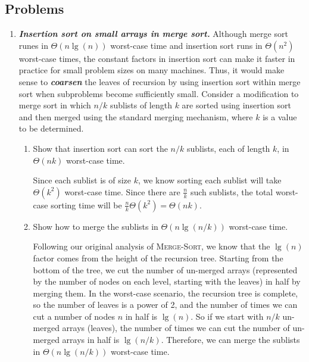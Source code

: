 \documentclass[Chapter02]{subfiles}
\begin{document}
	\subsection*{Problems}

	\begin{enumerate}[leftmargin=\labelsep,label={\textbf{\thesection-\arabic*}}]
		\item \textbf{\textit{Insertion sort on small arrays in merge sort.}} Although merge sort runes in $\Theta(n \lg(n))$ worst-case time and insertion sort runs in $\Theta(n^2)$ worst-case times, the constant factors in insertion sort can make it faster in practice for small problem sizes on many machines. Thus, it would make sense to \textbf{\textit{coarsen}} the leaves of recursion by using insertion sort within merge sort when subproblems become sufficiently small. Consider a modification to merge sort in which $n / k$ sublists of length $k$ are sorted using insertion sort and then merged using the standard merging mechanism, where $k$ is a value to be determined.
		\begin{enumerate}
			\item Show that insertion sort can sort the $n / k$ sublists, each of length $k$, in $\Theta(nk)$ worst-case time.
			\begin{answer}
				Since each sublist is of size $k$, we know sorting each sublist will take $\Theta(k^2)$ worst-case time. Since there are $\frac{n}{k}$ such sublists, the total worst-case sorting time will be $\frac{n}{k} \Theta(k^2) = \Theta(nk)$.
			\end{answer}

			\item Show how to merge the sublists in $\Theta(n \lg(n / k))$ worst-case time.
			\begin{answer}
				Following our original analysis of \textsc{Merge-Sort}, we know that the $\lg(n)$ factor comes from the height of the recursion tree. Starting from the bottom of the tree, we cut the number of un-merged arrays (represented by the number of nodes on each level, starting with the leaves) in half by merging them. In the worst-case scenario, the recursion tree is complete, so the number of leaves is a power of 2, and the number of times we can cut a number of nodes $n$ in half is $\lg(n)$. So if we start with $n / k$ un-merged arrays (leaves), the number of times we can cut the number of un-merged arrays in half is $\lg(n / k)$. Therefore, we can merge the sublists in $\Theta(n \lg(n / k))$ worst-case time.
			\end{answer}
			

\end{enumerate}
\end{enumerate}
\end{document}
